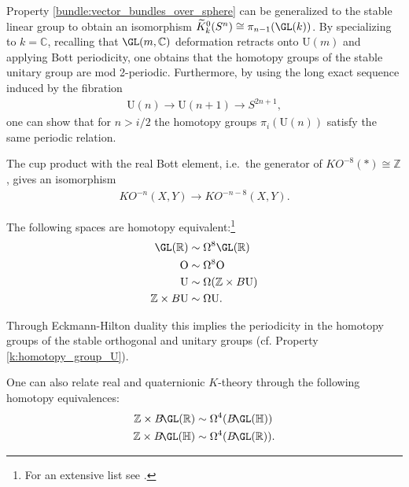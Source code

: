 {    \begin{property}\label{k:homotopy_group_U}
        Property \ref{bundle:vector_bundles_over_sphere} can be generalized to the stable linear group to obtain an isomorphism $\widetilde{K}^0_k(S^n)\cong\pi_{n-1}(\GL(k))$. By specializing to $k=\mathbb{C}$, recalling that $\GL(m,\mathbb{C})$ deformation retracts onto $\mathrm{U}(m)$ and applying Bott periodicity, one obtains that the homotopy groups of the stable unitary group are mod 2-periodic. Furthermore, by using the long exact sequence induced by the fibration
        \begin{gather}
            \mathrm{U}(n)\rightarrow\mathrm{U}(n+1)\rightarrow S^{2n+1},
        \end{gather}
        one can show that for $n>i/2$ the homotopy groups $\pi_i(\mathrm{U}(n))$ satisfy the same periodic relation.
    \end{property}

    \begin{theorem}
        The cup product with the real Bott element, i.e.~the generator of $KO^{-8}(\ast)\cong\mathbb{Z}$, gives an isomorphism
        \begin{gather}
            KO^{-n}(X,Y)\rightarrow KO^{-n-8}(X,Y).
        \end{gather}
    \end{theorem}

    \begin{theorem}
        The following spaces are homotopy equivalent:\footnote{For an extensive list see \cite{karoubi}.}
        \begin{align}
            \GL(\mathbb{R})&\sim\Omega^8\GL(\mathbb{R})\\
            \mathrm{O}&\sim\Omega^8\mathrm{O}\nonumber\\
            \mathrm{U}&\sim\Omega(\mathbb{Z}\times B\mathrm{U})\\
            \mathbb{Z}\times B\mathrm{U}&\sim\Omega\mathrm{U}.
        \end{align}
    \end{theorem}
    \begin{result}
        Through Eckmann-Hilton duality this implies the periodicity in the homotopy groups of the stable orthogonal and unitary groups (cf. Property \ref{k:homotopy_group_U}).
    \end{result}
    \begin{property}
        One can also relate real and quaternionic $K$-theory through the following homotopy equivalences:
        \begin{align}
            \mathbb{Z}\times B\!\GL(\mathbb{R})&\sim\Omega^4(B\!\GL(\mathbb{H}))\\
            \mathbb{Z}\times B\!\GL(\mathbb{H})&\sim\Omega^4(B\!\GL(\mathbb{R})).
        \end{align}
    \end{property}

}

